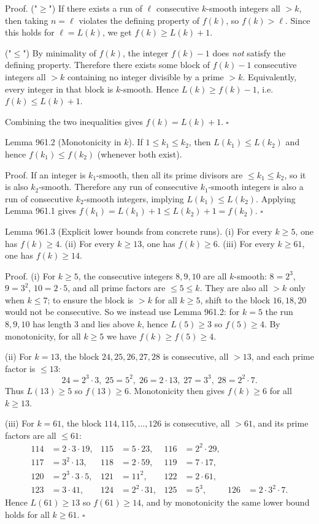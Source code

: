 Proof.
("$\ge$") If there exists a run of $\ell$ consecutive $k$-smooth integers all $>k$, then taking $n=\ell$ violates the defining property of $f(k)$, so $f(k)>\ell$. Since this holds for $\ell=L(k)$, we get $f(k)\ge L(k)+1$.

("$\le$") By minimality of $f(k)$, the integer $f(k)-1$ does \emph{not} satisfy the defining property. Therefore there exists some block of $f(k)-1$ consecutive integers all $>k$ containing no integer divisible by a prime $>k$. Equivalently, every integer in that block is $k$-smooth. Hence $L(k)\ge f(k)-1$, i.e. $f(k)\le L(k)+1$.

Combining the two inequalities gives $f(k)=L(k)+1.\;\square$

Lemma 961.2 (Monotonicity in $k$).
If $1\le k_1\le k_2$, then $L(k_1)\le L(k_2)$ and hence $f(k_1)\le f(k_2)$ (whenever both exist).

Proof.
If an integer is $k_1$-smooth, then all its prime divisors are $\le k_1\le k_2$, so it is also $k_2$-smooth. Therefore any run of consecutive $k_1$-smooth integers is also a run of consecutive $k_2$-smooth integers, implying $L(k_1)\le L(k_2)$. Applying Lemma 961.1 gives $f(k_1)=L(k_1)+1\le L(k_2)+1=f(k_2)$. $\square$

Lemma 961.3 (Explicit lower bounds from concrete runs).
(i) For every $k\ge 5$, one has $f(k)\ge 4$.
(ii) For every $k\ge 13$, one has $f(k)\ge 6$.
(iii) For every $k\ge 61$, one has $f(k)\ge 14$.

Proof.
(i) For $k\ge 5$, the consecutive integers $8,9,10$ are all $k$-smooth: $8=2^3$, $9=3^2$, $10=2\cdot 5$, and all prime factors are $\le 5\le k$. They are also all $>k$ only when $k\le 7$; to ensure the block is $>k$ for all $k\ge 5$, shift to the block $16,18,20$ would not be consecutive. So we instead use Lemma 961.2: for $k=5$ the run $8,9,10$ has length $3$ and lies above $k$, hence $L(5)\ge 3$ so $f(5)\ge 4$. By monotonicity, for all $k\ge 5$ we have $f(k)\ge f(5)\ge 4$.

(ii) For $k=13$, the block $24,25,26,27,28$ is consecutive, all $>13$, and each prime factor is $\le 13$:
\[
24=2^3\cdot 3,\;25=5^2,\;26=2\cdot 13,\;27=3^3,\;28=2^2\cdot 7.
\]
Thus $L(13)\ge 5$ so $f(13)\ge 6$. Monotonicity then gives $f(k)\ge 6$ for all $k\ge 13$.

(iii) For $k=61$, the block $114,115,\dots,126$ is consecutive, all $>61$, and its prime factors are all $\le 61$:
\[
\begin{aligned}
114&=2\cdot 3\cdot 19, &115&=5\cdot 23, &116&=2^2\cdot 29,\\
117&=3^2\cdot 13, &118&=2\cdot 59, &119&=7\cdot 17,\\
120&=2^3\cdot 3\cdot 5, &121&=11^2, &122&=2\cdot 61,\\
123&=3\cdot 41, &124&=2^2\cdot 31, &125&=5^3, &126&=2\cdot 3^2\cdot 7.
\end{aligned}
\]
Hence $L(61)\ge 13$ so $f(61)\ge 14$, and by monotonicity the same lower bound holds for all $k\ge 61$. $\square$

